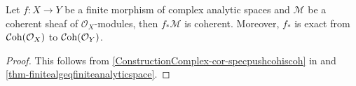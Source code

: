 \begin{corollary}
    Let $f:X\rightarrow Y$ be a finite morphism of complex analytic spaces and $\mathcal{M}$ be a coherent sheaf of $\mathcal{O}_X$-modules, then $f_*\mathcal{M}$ is coherent. Moreover, $f_*$ is exact from $\mathcal{C}\mathrm{oh}(\mathcal{O}_X)$ to
    $\mathcal{C}\mathrm{oh}(\mathcal{O}_Y)$.
\end{corollary}
\begin{proof}
    This follows from \cref{ConstructionComplex-cor-specpushcohiscoh} in  and \cref{thm-finitealgeqfiniteanalyticspace}.
\end{proof}





\printbibliography



\iffalse

